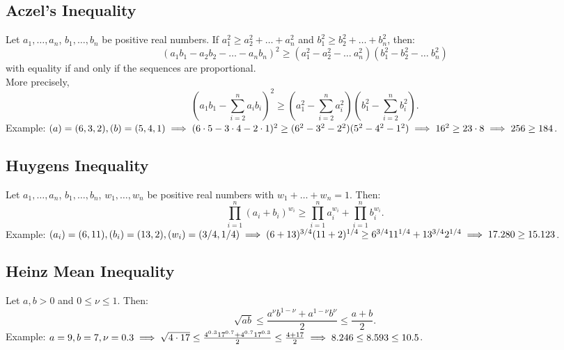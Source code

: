 \documentclass[a4paper,11pt]{article}
\begin{document}
\subsection{Aczel's Inequality}
\begin{tcolorbox}
    Let $a_1,\dots,a_n$, $b_1,\dots,b_n$ be positive real numbers. If $a_1^2\geq a_2^2+\dots+a_n^2$ and $b_1^2\geq b_2^2+\dots+b_n^2$, then:
    \[
    (a_1b_1 - a_2b_2 - \dots - a_nb_n)^2 \geq (a_1^2 - a_2^2 - \dots \ a_n^2)(b_1^2 - b_2^2 - \dots \ b_n^2)
    \]
    with equality if and only if the sequences are proportional. \\[6pt]
    More precisely,
    \[
    \left( a_1b_1 - \sum_{i=2}^n a_ib_i \right)^2 \geq \left( a_1^2 - \sum_{i=2}^n a_i^2 \right) \left( b_1^2 - \sum_{i=2}^n b_i^2 \right).
    \]
    Example: $(a)=(6,3,2), (b)=(5,4,1) \\[6pt]
    \implies (6\cdot5 - 3\cdot4 - 2\cdot 1)^2 \geq (6^2-3^2-2^2)(5^2-4^2-1^2) \implies 16^2 \geq 23\cdot8 \implies 256\geq184$.
\end{tcolorbox}


\subsection{Huygens Inequality}
\begin{tcolorbox}
    Let $a_1,\dots,a_n$, $b_1,\dots,b_n$, $w_1,\dots,w_n$ be positive real numbers with $w_1+\dots+w_n=1$. Then:
    \[
    \prod_{i=1}^n (a_i+b_i)^{w_i} \geq \prod_{i=1}^n a_i^{w_i} + \prod_{i=1}^n b_i^{w_i}.
    \]
    Example: $\textstyle (a_i)=(6,11), (b_i)=(13,2), (w_i)=(3/4, 1/4) \\[6pt]
    \implies (6+13)^{3/4}(11+2)^{1/4} \geq 6^{3/4}11^{1/4} + 13^{3/4}2^{1/4} \implies 17.280\geq15.123$.
\end{tcolorbox}


\subsection{Heinz Mean Inequality}
\begin{tcolorbox}
    Let $a,b>0$ and $0\leq\nu\leq1$. Then:
    \[
    \sqrt{ab} \leq \frac{a^{\nu}b^{1-\nu} + a^{1-\nu}b^{\nu}}{2} \leq \frac{a+b}{2}.
    \]
    Example: $\textstyle a=9,b=7,\nu=0.3 \\[6pt]
    \implies \sqrt{4\cdot17} \leq \frac{4^{0.3}17^{0.7} + 4^{0.7}17^{0.3}}{2} \leq \frac{4+17}{2} \implies 8.246 \leq 8.593 \leq 10.5$.
\end{tcolorbox}
\end{document}
